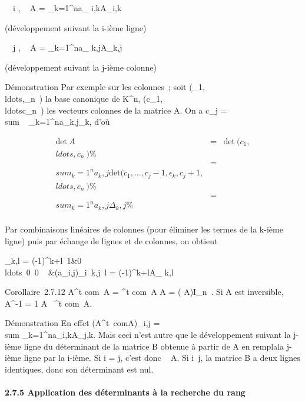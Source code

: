 \documentclass[]{article}
\begin{document}
\forall~~i \in [1,n],\quad
{}~ A =
\sum _k=1^na_
i,kA_i,k

(développement suivant la i-ième ligne)

\forall~~j \in [1,n],\quad
{}~ A =
\sum _k=1^na_
k,jA_k,j

(développement suivant la j-ième colonne)

Démonstration Par exemple sur les colonnes~; soit
(\epsilon_1,\\ldots,\epsilon_n~)
la base canonique de K^n,
(c_1,\\ldotsc_n~)
les vecteurs colonnes de la matrice A. On a c_j
= \\sum ~
_k=1^na_k,j\epsilon_k, d'où

\begin{align*}
\mathrm{det}~ A& =&
\mathrm{det}~
(c_1,\\ldots,c_n~)
\%& \\ & =& \\sum
_k=1^na_ k,j \mathrm{det}
(c_1,\ldots,c_j-1,\epsilon_k,c_j+1,\\ldots,c_n~)\%&
\\ & =& \\sum
_k=1^na_ k,j\Delta_k,j \%&
\\ \end{align*}

Par combinaisons linéaires de colonnes (pour éliminer les termes de la
k-ième ligne) puis par échange de lignes et de colonnes, on obtient

\Delta_k,l = (-1)^k+l\left
\matrix\,1&0\\ldots~0
\cr \matrix\,0
\cr \⋮~
&(a_i,j)_i\neq~k,j\mathrel\neq~l\right
 = (-1)^k+lA_ k,l

Corollaire~2.7.12 A^t com~A =
^t com~A A =
( A)I_n~.
Si A est inversible, A^-1 = 1 \over
{} A~
^t com~A.

Démonstration En effet (A^t\
comA)_i,j =\ \\sum
 _k=1^na_i,kA_j,k. Mais ceci n'est
autre que le développement suivant la j-ième ligne du déterminant de la
matrice B obtenue à partir de A en rempla\ccant la
j-ième ligne par la i-ième. Si i = j, c'est donc
~ A. Si
i\neq~j, la matrice B a deux lignes identiques,
donc son déterminant est nul.

\paragraph{2.7.5 Application des déterminants à la recherche du rang}
\end{document}
